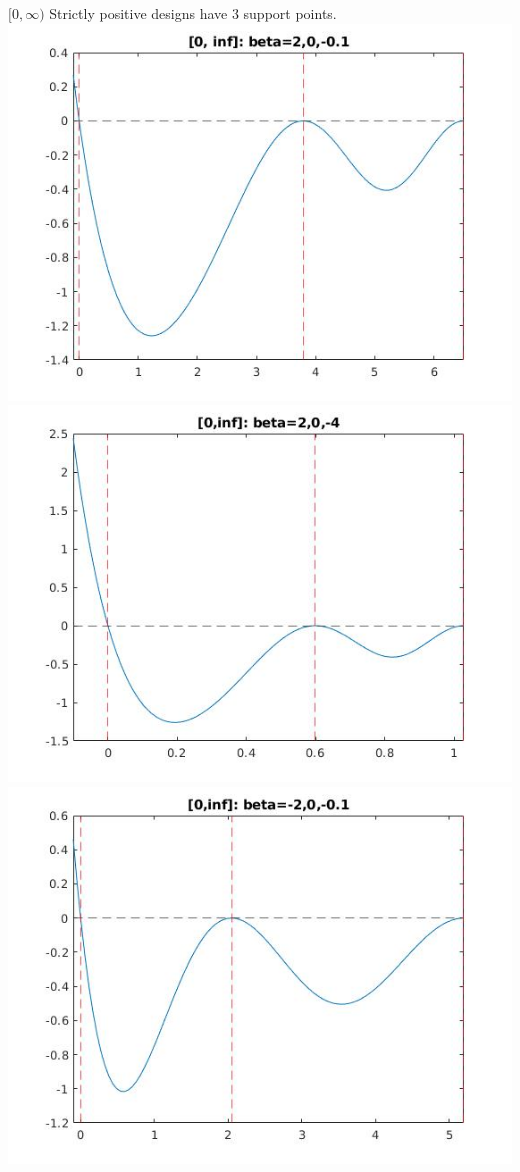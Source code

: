 \documentclass[11pt]{beamer}
\begin{document}
\begin{frame}{$[0, \infty)$}
Strictly positive designs have 3 support points.\\
\includegraphics[scale=0.2]{quadplots/positive_1.jpg}
\includegraphics[scale=0.2]{quadplots/positive_2.jpg}\\
\includegraphics[scale=0.2]{quadplots/positive_3.jpg}

\end{frame}
\end{document}
